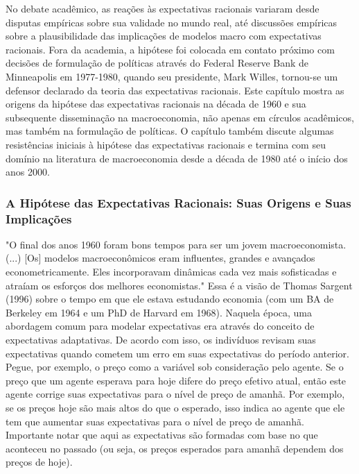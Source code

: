\documentclass[12pt]{article}
\begin{document}
No debate acadêmico, as reações às expectativas racionais variaram desde disputas empíricas sobre sua validade no mundo real, até discussões empíricas sobre a plausibilidade das implicações de modelos macro com expectativas racionais. Fora da academia, a hipótese foi colocada em contato próximo com decisões de formulação de políticas através do Federal Reserve Bank de Minneapolis em 1977-1980, quando seu presidente, Mark Willes, tornou-se um defensor declarado da teoria das expectativas racionais. Este capítulo mostra as origens da hipótese das expectativas racionais na década de 1960 e sua subsequente disseminação na macroeconomia, não apenas em círculos acadêmicos, mas também na formulação de políticas. O capítulo também discute algumas resistências iniciais à hipótese das expectativas racionais e termina com seu domínio na literatura de macroeconomia desde a década de 1980 até o início dos anos 2000.

\subsubsection{\textbf{A Hipótese das Expectativas Racionais: Suas Origens e Suas Implicações}}

"O final dos anos 1960 foram bons tempos para ser um jovem macroeconomista. (...) [Os] modelos macroeconômicos eram influentes, grandes e avançados econometricamente. Eles incorporavam dinâmicas cada vez mais sofisticadas e atraíam os esforços dos melhores economistas." Essa é a visão de Thomas Sargent (1996) sobre o tempo em que ele estava estudando economia (com um BA de Berkeley em 1964 e um PhD de Harvard em 1968). Naquela época, uma abordagem comum para modelar expectativas era através do conceito de expectativas adaptativas. De acordo com isso, os indivíduos revisam suas expectativas quando cometem um erro em suas expectativas do período anterior. Pegue, por exemplo, o preço como a variável sob consideração pelo agente. Se o preço que um agente esperava para hoje difere do preço efetivo atual, então este agente corrige suas expectativas para o nível de preço de amanhã. Por exemplo, se os preços hoje são mais altos do que o esperado, isso indica ao agente que ele tem que aumentar suas expectativas para o nível de preço de amanhã. Importante notar que aqui as expectativas são formadas com base no que aconteceu no passado (ou seja, os preços esperados para amanhã dependem dos preços de hoje).
\end{document}
